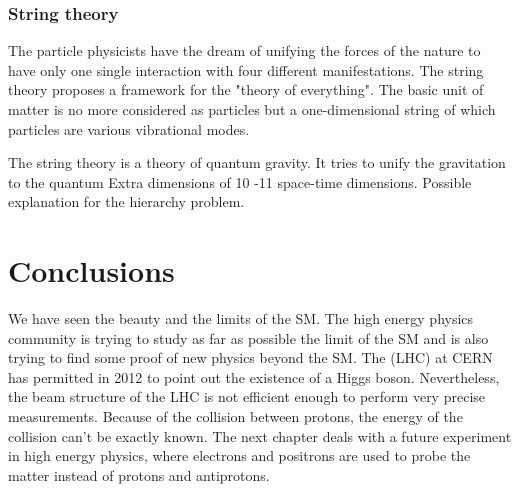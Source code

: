       \subsubsection{String theory}

      The particle physicists have the dream of unifying the forces of the nature to have only one single interaction with four different manifestations.
      The string theory proposes a framework for the "theory of everything".
      The basic unit of matter is no more considered as particles but a one-dimensional string of which particles are various vibrational modes.

      The string theory is a theory of quantum gravity.
      It tries to unify the gravitation to the quantum 
      Extra dimensions of 10 -11 space-time dimensions.
      Possible explanation for the hierarchy problem.

    \section{Conclusions}

    We have seen the beauty and the limits of the \gls{SM}.
    The high energy physics community is trying to study as far as possible the limit of the \gls{SM} and is also trying to find some proof of new physics beyond the \gls{SM}.
    The (LHC) at CERN has permitted in 2012 to point out the existence of a Higgs boson.  
    Nevertheless, the beam structure of the LHC is not efficient enough to perform very precise measurements.
    Because of the collision between protons, the energy of the collision can't be exactly known.
    The next chapter deals with a future experiment in high energy physics, where electrons and positrons are used to probe the matter instead of protons and antiprotons.

